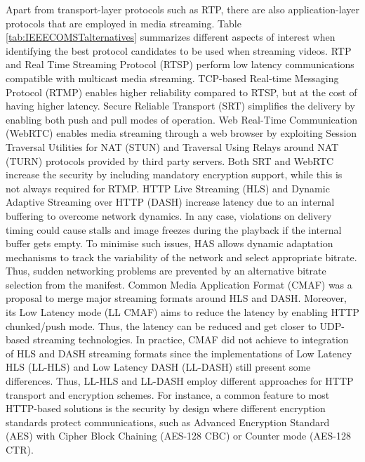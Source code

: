 Apart from transport-layer protocols such as RTP, there are also application-layer protocols that are employed in media streaming. Table \ref{tab:IEEECOMSTalternatives} summarizes different aspects of interest when identifying the best protocol candidates to be used when streaming videos. RTP and Real Time Streaming Protocol (RTSP) \cite{schulzrinne1998real} perform low latency communications compatible with multicast media streaming. TCP-based Real-time Messaging Protocol (RTMP) \cite{thornburgh2014adobe} enables higher reliability compared to RTSP, but at the cost of having higher latency. Secure Reliable Transport (SRT) \cite{srt2021} simplifies the delivery by enabling both push and pull modes of operation. Web Real-Time Communication (WebRTC) \cite{holmberg2015web} enables media streaming through a web browser by exploiting Session Traversal Utilities for NAT (STUN) \cite{wing2008session} and Traversal Using Relays around NAT (TURN) \cite{mahy2010traversal} protocols provided by third party servers. Both SRT and WebRTC increase the security by including mandatory encryption support, while this is not always required for RTMP.
HTTP Live Streaming (HLS) \cite{hls2017} and Dynamic Adaptive Streaming over HTTP (DASH) \cite{sodagar2011mpeg} increase latency due to an internal buffering to overcome network dynamics. In any case, violations on delivery timing could cause stalls and image freezes during the playback if the internal buffer gets empty. To minimise such issues, HAS allows dynamic adaptation mechanisms to track the variability of the network and select appropriate bitrate. Thus, sudden networking problems are prevented by an alternative bitrate selection from the manifest. Common Media Application Format (CMAF) \cite{hughes2017information} was a proposal to merge major streaming formats around HLS and DASH. Moreover, its Low Latency mode (LL CMAF) aims to reduce the latency by enabling HTTP chunked/push mode. Thus, the latency can be reduced and get closer to UDP-based streaming technologies. In practice, CMAF did not achieve to integration of HLS and DASH streaming formats since the implementations of Low Latency HLS (\hbox{LL-HLS}) \cite{durak2020evaluating} and Low Latency DASH (\hbox{LL-DASH}) \cite{bouzakaria2014overhead} still present some differences. Thus, \hbox{LL-HLS} and \hbox{LL-DASH} employ different approaches for HTTP transport and encryption schemes. For instance, a common feature to most HTTP-based solutions is the security by design where different encryption standards protect communications, such as Advanced Encryption Standard (AES) \cite{chown2002advanced} with Cipher Block Chaining (AES-128 CBC) or Counter mode (AES-128 CTR).

